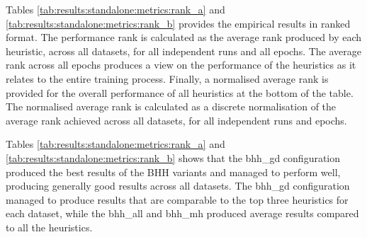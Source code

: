 \documentclass[preprint,review,12pt]{elsarticle}
\begin{document}
Tables \ref{tab:results:standalone:metrics:rank_a} and \ref{tab:results:standalone:metrics:rank_b} provides the empirical results in ranked format. The performance rank is calculated as the average rank produced by each heuristic, across all datasets, for all independent runs and all epochs. The average rank across all epochs produces a view on the performance of the heuristics as it relates to the entire training process. Finally, a normalised average rank is provided for the overall performance of all heuristics at the bottom of the table. The normalised average rank is calculated as a discrete normalisation of the average rank achieved across all datasets, for all independent runs and epochs.

Tables \ref{tab:results:standalone:metrics:rank_a} and \ref{tab:results:standalone:metrics:rank_b} shows that the bhh\_gd configuration produced the best results of the \acs{BHH} variants and managed to perform well, producing generally good results across all datasets. The bhh\_gd configuration managed to produce results that are comparable to the top three heuristics for each dataset, while the bhh\_all and bhh\_mh produced average results compared to all the heuristics.
\end{document}
